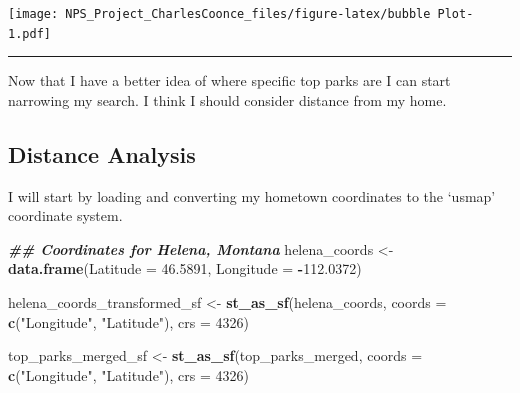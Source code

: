 \documentclass[
]{article}
\newenvironment{Shaded}{\begin{snugshade}}{\end{snugshade}}
\newcommand{\AttributeTok}[1]{\textcolor[rgb]{0.13,0.29,0.53}{#1}}
\newcommand{\DecValTok}[1]{\textcolor[rgb]{0.00,0.00,0.81}{#1}}
\newcommand{\DocumentationTok}[1]{\textcolor[rgb]{0.56,0.35,0.01}{\textbf{\textit{#1}}}}
\newcommand{\FloatTok}[1]{\textcolor[rgb]{0.00,0.00,0.81}{#1}}
\newcommand{\FunctionTok}[1]{\textcolor[rgb]{0.13,0.29,0.53}{\textbf{#1}}}
\newcommand{\NormalTok}[1]{#1}
\newcommand{\OtherTok}[1]{\textcolor[rgb]{0.56,0.35,0.01}{#1}}
\newcommand{\SpecialCharTok}[1]{\textcolor[rgb]{0.81,0.36,0.00}{\textbf{#1}}}
\newcommand{\StringTok}[1]{\textcolor[rgb]{0.31,0.60,0.02}{#1}}
\begin{document}
\texttt{[image: NPS\_Project\_CharlesCoonce\_files/figure-latex/bubble Plot-1.pdf]}

\begin{center}\rule{0.5\linewidth}{0.5pt}\end{center}

Now that I have a better idea of where specific top parks are I can
start narrowing my search. I think I should consider distance from my
home.

\label{distance_analysis}
\subsection{Distance Analysis}\label{distance-analysis}

I will start by loading and converting my hometown coordinates to the
`usmap' coordinate system.

\begin{Shaded}
\begin{Highlighting}[]
  \DocumentationTok{\#\# Coordinates for Helena, Montana}
\NormalTok{helena\_coords }\OtherTok{\textless{}{-}} \FunctionTok{data.frame}\NormalTok{(}\AttributeTok{Latitude =} \FloatTok{46.5891}\NormalTok{, }\AttributeTok{Longitude =} \SpecialCharTok{{-}}\FloatTok{112.0372}\NormalTok{)}

\NormalTok{helena\_coords\_transformed\_sf }\OtherTok{\textless{}{-}} \FunctionTok{st\_as\_sf}\NormalTok{(helena\_coords, }
                                    \AttributeTok{coords =} \FunctionTok{c}\NormalTok{(}\StringTok{"Longitude"}\NormalTok{, }\StringTok{"Latitude"}\NormalTok{), }
                                    \AttributeTok{crs =} \DecValTok{4326}\NormalTok{)}

\NormalTok{top\_parks\_merged\_sf }\OtherTok{\textless{}{-}} \FunctionTok{st\_as\_sf}\NormalTok{(top\_parks\_merged, }
                                    \AttributeTok{coords =} \FunctionTok{c}\NormalTok{(}\StringTok{"Longitude"}\NormalTok{, }\StringTok{"Latitude"}\NormalTok{), }
                                    \AttributeTok{crs =} \DecValTok{4326}\NormalTok{)}
\end{Highlighting}
\end{Shaded}
\end{document}
